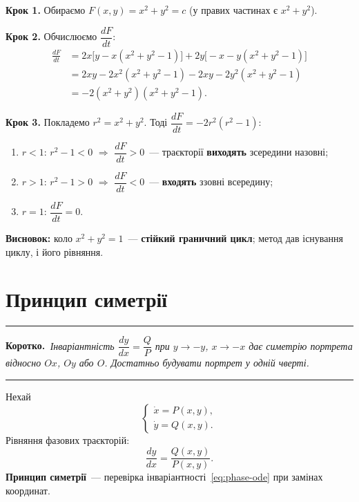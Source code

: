\documentclass[12pt,a4paper]{article}
\newenvironment{korotko}
  {\par\medskip\noindent\begingroup\color{accent!75!black}\rule{\linewidth}{0.4pt}\par
   \noindent\textbf{Коротко.}\itshape\,}
  {\par\noindent\rule{\linewidth}{0.4pt}\endgroup\medskip}
\begin{document}
\textbf{Крок 1.} Обираємо $F(x,y)=x^2+y^2=c$ (у правих частинах є $x^2+y^2$).

\textbf{Крок 2.} Обчислюємо $\dfrac{dF}{dt}$:
\begin{align*}
  \frac{dF}{dt}
  &= 2x\bigl[y-x(x^2+y^2-1)\bigr]
   + 2y\bigl[-x-y(x^2+y^2-1)\bigr] \\
  &= 2xy - 2x^2(x^2+y^2-1) - 2xy - 2y^2(x^2+y^2-1) \\
  &= -2(x^2+y^2)(x^2+y^2-1).
\end{align*}

\textbf{Крок 3.} Покладемо $r^2=x^2+y^2$. Тоді $\dfrac{dF}{dt}=-2r^2(r^2-1)$:
\begin{enumerate}[leftmargin=1.6em]
  \item $r<1$: $r^2-1<0$ $\Rightarrow$ $\dfrac{dF}{dt}>0$~--- траєкторії
        \textbf{виходять} зсередини назовні;
  \item $r>1$: $r^2-1>0$ $\Rightarrow$ $\dfrac{dF}{dt}<0$~--- \textbf{входять}
        ззовні всередину;
  \item $r=1$: $\dfrac{dF}{dt}=0$.
\end{enumerate}

\textbf{Висновок:} коло $x^2+y^2=1$~--- \textbf{стійкий граничний цикл};
метод дав існування циклу, і його рівняння.

\section{Принцип симетрії}\label{sec:symmetry}

\begin{korotko}
Інваріантність $\dfrac{dy}{dx}=\dfrac{Q}{P}$ при $y\to-y$, $x\to-x$ дає
симетрію портрета відносно $Ox$, $Oy$ або $O$. Достатньо будувати портрет у
одній чверті.
\end{korotko}

Нехай
\begin{equation}\label{eq:symmetry-system}
\begin{cases}
  \dot{x} = P(x,y),\\
  \dot{y} = Q(x,y).
\end{cases}
\end{equation}
Рівняння фазових траєкторій:
\begin{equation}\label{eq:phase-ode}
  \frac{dy}{dx} = \frac{Q(x,y)}{P(x,y)}.
\end{equation}
\textbf{Принцип симетрії}~--- перевірка інваріантності~\eqref{eq:phase-ode}
при замінах координат.
\end{document}
